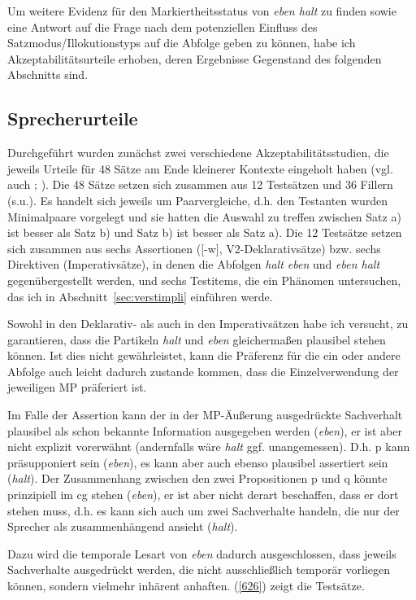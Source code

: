 Um weitere Evidenz für den Markiertheitsstatus von \textit{eben halt} zu finden sowie eine Antwort auf die Frage nach dem potenziellen Einfluss des Satzmodus/Illoku\-tionstyps auf die Abfolge geben zu können, habe ich Akzeptabilitätsurteile erhoben, deren Ergebnisse Gegenstand des folgenden Abschnitts sind.

\subsection{Sprecherurteile}
\label{sec:spu}
Durchgeführt wurden zunächst zwei verschiedene Akzeptabilitätsstudien, die jeweils Urteile für 48 Sätze am Ende kleinerer Kontexte eingeholt haben (vgl. auch \citealt[155-161]{Mueller2016b}; \citeyear[235-238]{Mueller2017a}). Die 48 Sätze setzen sich zusammen aus 12 Testsätzen und 36 Fillern (s.u.). Es handelt sich jeweils um Paarvergleiche, d.h. den Testanten wurden Minimalpaare vorgelegt und sie hatten die Auswahl zu treffen zwischen \glqq Satz a) ist besser als Satz b)\grqq{} und \glqq Satz b) ist besser als Satz a)\grqq{}. Die 12 Testsätze setzen sich zusammen aus sechs Assertionen ($[$-w$]$, V2-Deklarativsätze) bzw. sechs Direktiven (Imperativsätze), in denen die Abfolgen \textit{halt eben} und \textit{eben halt} gegenübergestellt werden, und sechs Testitems, die ein Phänomen untersuchen, das ich in Abschnitt~\ref{sec:verstimpli} einführen werde.

Sowohl in den Deklarativ- als auch in den Imperativsätzen habe ich versucht, zu garantieren, dass die Partikeln \textit{halt} und \textit{eben} gleichermaßen plausibel stehen können. Ist dies nicht gewährleistet, kann die Präferenz für die ein oder andere Abfolge auch leicht dadurch zustande kommen, dass die Einzelverwendung der jeweiligen MP präferiert ist.

Im Falle der Assertion kann der in der MP-Äußerung ausgedrückte Sachverhalt plausibel als schon bekannte Information ausgegeben werden (\textit{eben}), er ist aber nicht explizit vorerwähnt (andernfalls wäre \textit{halt} ggf. unangemessen). D.h. p kann präsupponiert sein (\textit{eben}), es kann aber auch ebenso plausibel assertiert sein (\textit{halt}). Der Zusammenhang zwischen den zwei Propositionen p und q könnte prinzipiell im cg stehen (\textit{eben}), er ist aber nicht derart beschaffen, dass er dort stehen muss, d.h. es kann sich auch um zwei Sachverhalte handeln, die nur der Sprecher als zusammenhängend ansieht (\textit{halt}). 

Dazu wird die temporale Lesart von \textit{eben} dadurch ausgeschlossen, dass jeweils Sachverhalte ausgedrückt werden, die nicht ausschließlich temporär vorliegen können, sondern vielmehr inhärent anhaften. (\ref{626}) zeigt die Testsätze.

